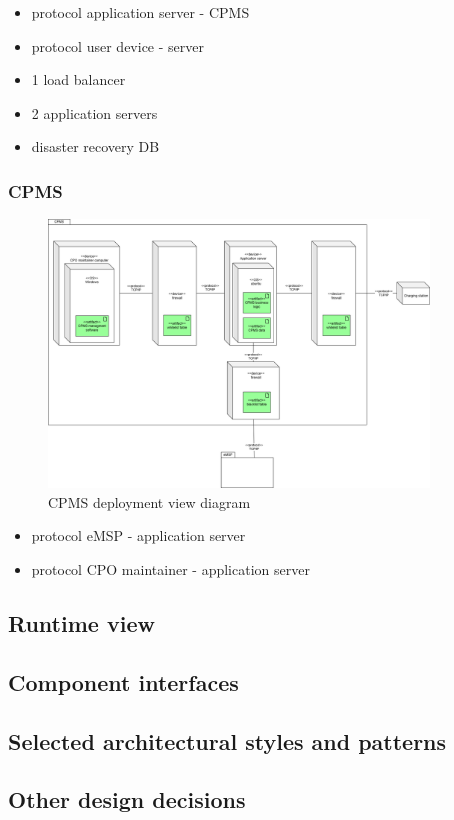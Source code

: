 \begin{itemize}
    \item protocol application server - CPMS
    \item protocol user device - server
    \item 1 load balancer
    \item 2 application servers
    \item disaster recovery DB
\end{itemize}

\subsubsection{\ac{CPMS}}
\begin{figure}[!h]
    \begin{center}
        \includegraphics[keepaspectratio, width=0.9\textwidth]{Graphics/DD-CPMS-deployment.drawio.png}
        \caption{CPMS deployment view diagram}
        \label{fig:CPMS-deployment}
    \end{center}
\end{figure}

\begin{itemize}
    \item protocol eMSP - application server
    \item protocol CPO maintainer - application server
\end{itemize}
\clearpage

\subsection{Runtime view}
\subsection{Component interfaces}
\subsection{Selected architectural styles and patterns}
\subsection{Other design decisions}
\clearpage